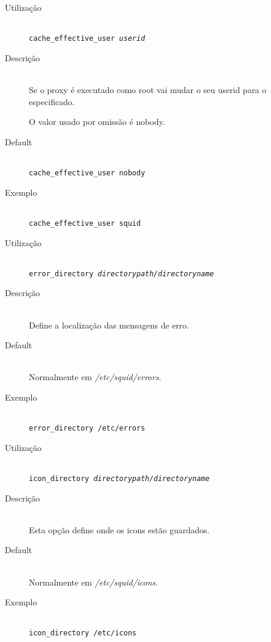 \begin{description}
\item[Utilização]~\\
\texttt{cache\_effective\_user \emph{userid}}

\item[Descrição]~\\
Se o proxy é executado como root vai mudar o seu userid para o
especificado.

O valor usado por omissão é nobody.

\item[Default]~\\
\texttt{cache\_effective\_user nobody}

\item[Exemplo]~\\
\texttt{cache\_effective\_user squid}
\end{description}



\begin{description}
\item[Utilização]~\\
\texttt{error\_directory \emph{directorypath/directoryname}}

\item[Descrição]~\\
Define a localização das mensagens de erro.

\item[Default]~\\
Normalmente em \emph{/etc/squid/errors}.

\item[Exemplo]~\\
\texttt{error\_directory /etc/errors}
\end{description}


\begin{description}
\item[Utilização]~\\
\texttt{icon\_directory \emph{directorypath/directoryname}}

\item[Descrição]~\\
Esta opção define onde os icons estão guardados.

\item[Default]~\\
Normalmente em \emph{/etc/squid/icons}.

\item[Exemplo]~\\
\texttt{icon\_directory /etc/icons}
\end{description}

